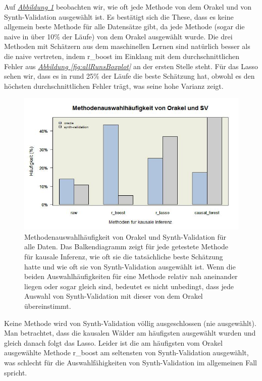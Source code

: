 \documentclass[12pt,a4paper,twoside]{scrartcl}
\numberwithin{equation}{section}
\newcommand{\reffig}[1]{\emph{\hyperref[#1]{Abbildung \ref*{#1}}}}
\begin{document}
\noindent
Auf \reffig{fig:allRunsBarplot} beobachten wir, wie oft jede Methode von dem Orakel und von Synth-Validation ausgewählt ist. Es bestätigt sich die These, dass es keine allgemein beste Methode für alle Datensätze gibt, da jede Methode (sogar die naive in über 10\% der Läufe) von dem Orakel ausgewählt wurde. Die drei Methoden mit Schätzern aus dem maschinellen Lernen sind natürlich besser als die naive vertreten, indem r\_boost im Einklang mit dem durchschnittlichen Fehler aus \reffig{fig:allRunsBoxplot} an der ersten Stelle steht. Für das Lasso sehen wir, dass es in rund 25\% der Läufe die beste Schätzung hat, obwohl es den höchsten durchschnittlichen Fehler trägt, was seine hohe Varianz zeigt. \par

\begin{center}
\begin{figure}[h]
    \centering
    \includegraphics[height=0.5\textwidth, width=1\textwidth]{figures/plots/allRunsBarplot.jpeg}
    \caption[Methodenauswahlhäufigkeit von Orakel und Synth-Validation für alle Daten]{Methodenauswahlhäufigkeit von Orakel und Synth-Validation für alle Daten. Das Balkendiagramm zeigt für jede getestete Methode für kausale Inferenz, wie oft   sie die tatsächliche beste Schätzung hatte und wie oft sie von Synth-Validation ausgewählt ist. Wenn die beiden Auswahlhäufigkeiten für eine Methode relativ nah aneinander liegen oder sogar gleich sind, bedeutet es nicht unbedingt, dass jede Auswahl von Synth-Validation mit dieser von dem Orakel übereinstimmt.}\label{fig:allRunsBarplot}
  \end{figure}
\end{center}

\noindent
Keine Methode wird von Synth-Validation völlig ausgeschlossen (nie ausgewählt). Man betrachtet, dass die kausalen Wälder am häufigsten ausgewählt wurden und gleich danach folgt das Lasso. Leider ist die am häufigsten vom Orakel ausgewählte Methode r\_boost am seltensten von Synth-Validation ausgewählt, was schlecht für die Auswahlfähigkeiten von Synth-Validation im allgemeinen Fall spricht. \par
\end{document}
